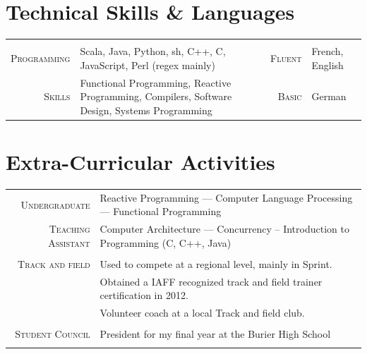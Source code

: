 \documentclass[a4paper,11pt]{article} %
\begin{document}

\section{Technical Skills \& Languages}
\begin{center}

\vspace{-0.3cm}
\begin{tabularx}{\textwidth}{rX|rl}

& & & \\
\textsc{\large{Programming}} & Scala, Java, Python, sh, C++, C, JavaScript, Perl (regex mainly) &
\textsc{\large{Fluent}} & French, English \\
\textsc{\large{Skills}} & Functional Programming, Reactive Programming, Compilers, Software Design, Systems Programming &
\textsc{\large{Basic}} & German \\

\end{tabularx}

\end{center}


\section{Extra-Curricular Activities}
\begin{tabular}{rl}
\textsc{\large{Undergraduate}} &
Reactive Programming ---
Computer Language Processing --- Functional Programming \\
\textsc{\large{Teaching Assistant}} &
Computer Architecture --- Concurrency -- Introduction to Programming (C, C++, Java) \\
\multicolumn{2}{c}{} \\

\textsc{\large{Track and field}} &
Used to compete at a regional level, mainly in Sprint.\\
& Obtained a IAFF recognized track and field trainer certification in 2012. \\
& Volunteer coach at a local Track and field club.\\
\multicolumn{2}{c}{} \\

\textsc{\large{Student Council}} &
President for my final year at the Burier High School \\
\multicolumn{2}{c}{} \\

\end{tabular}
\end{document}
